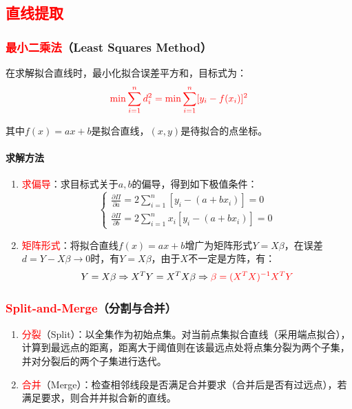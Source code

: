 \documentclass[
12pt, %
a4paper, 
oneside, %
]{scrartcl}
\begin{document}
\subsection[直线提取]{\textcolor{red}{直线提取}}
\subsubsection[最小二乘法]{\textcolor{red}{最小二乘法}（Least Squares Method）}
在求解拟合直线时，最小化拟合误差平方和，目标式为：
$$ \textcolor{red}{\min \sum_{i = 1}^{n} d_i^2 = \min \sum_{i = 1}^{n}[y_i - f(x_i)]^2} $$

其中$ f(x) = ax + b $是拟合直线，$ (x, y) $是待拟合的点坐标。
\paragraph{求解方法}
\begin{enumerate}
\item \textcolor{red}{求偏导}：求目标式关于$ a, b $的偏导，得到如下极值条件：
$$ \begin{cases} \frac{\partial \Pi}{\partial a} = 2 \sum_{i = 1}^{n} [y_i - (a + b x_i)] = 0 \\ \frac{\partial \Pi}{\partial b} = 2 \sum_{i = 1}^{n} x_i [y_i - (a + b x_i)] = 0 \end{cases} $$
\item \textcolor{red}{矩阵形式}：将拟合直线$ f(x) = ax + b $增广为矩阵形式$ Y = X \beta $，在误差$ d = Y - X \beta \to 0 $时，有$ Y = X \beta $，由于$ X $不一定是方阵，有：
$$ Y = X \beta \Rightarrow X^T Y = X^T X \beta \Rightarrow \textcolor{red}{\beta = (X^T X)^{-1}X^T Y} $$
\end{enumerate}
\subsubsection[Split-and-Merge]{\textcolor{red}{Split-and-Merge}（分割与合并）}
\begin{enumerate}
\item \textcolor{red}{分裂}（Split）：以全集作为初始点集。对当前点集拟合直线（采用端点拟合），计算到最远点的距离，距离大于阈值则在该最远点处将点集分裂为两个子集，并对分裂后的两个子集进行迭代。
\item \textcolor{red}{合并}（Merge）：检查相邻线段是否满足合并要求（合并后是否有过远点），若满足要求，则合并并拟合新的直线。
\end{enumerate}
\end{document}
